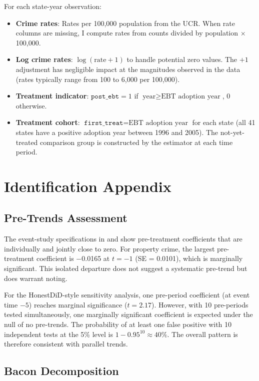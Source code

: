\documentclass[12pt]{article}
\begin{document}
For each state-year observation:
\begin{itemize}
\item \textbf{Crime rates}: Rates per 100,000 population from the UCR. When rate columns are missing, I compute rates from counts divided by population $\times$ 100,000.
\item \textbf{Log crime rates}: $\log(\text{rate} + 1)$ to handle potential zero values. The $+1$ adjustment has negligible impact at the magnitudes observed in the data (rates typically range from 100 to 6,000 per 100,000).
\item \textbf{Treatment indicator}: $\texttt{post\_ebt} = 1$ if $\text{year} \geq \text{EBT adoption year}$, 0 otherwise.
\item \textbf{Treatment cohort}: $\texttt{first\_treat} = \text{EBT adoption year}$ for each state (all 41 states have a positive adoption year between 1996 and 2005). The not-yet-treated comparison group is constructed by the estimator at each time period.
\end{itemize}


\section{Identification Appendix} \label{app:identification}

\subsection{Pre-Trends Assessment}

The event-study specifications in  and  show pre-treatment coefficients that are individually and jointly close to zero. For property crime, the largest pre-treatment coefficient is $-$0.0165 at $t = -1$ (SE = 0.0101), which is marginally significant. This isolated departure does not suggest a systematic pre-trend but does warrant noting.

For the HonestDiD-style sensitivity analysis, one pre-period coefficient (at event time $-5$) reaches marginal significance ($t = 2.17$). However, with 10 pre-periods tested simultaneously, one marginally significant coefficient is expected under the null of no pre-trends. The probability of at least one false positive with 10 independent tests at the 5\% level is $1 - 0.95^{10} \approx 40\%$. The overall pattern is therefore consistent with parallel trends.

\subsection{Bacon Decomposition}
\end{document}
